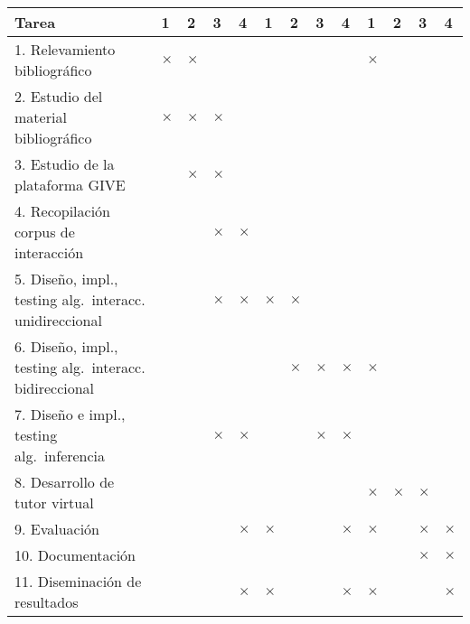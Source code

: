 {\footnotesize
\begin{center}
\begin{tabular}{|p{7cm}||p{2mm}|p{2mm}|p{2mm}|p{2mm}||p{2mm}|p{2mm}|p{2mm}|p{2mm
}||p{2mm}|p{2mm}|p{2mm}|p{2mm}||}
\hline
 \rowcolor[rgb]{0.8,0.8,0.8}\hspace{3.5cm}Tarea & 1 & 2 & 3 & 4 & 1 & 2 & 3 & 4
& 1 & 2 & 3 & 4\\
\hline 1. Relevamiento bibliogr\'afico & $\times$ & $\times$ &&&&&&&$\times$&&&\\
\hline 2. Estudio del material bibliogr\'afico & $\times$ & $\times$ & $\times$ &  &&&&&&&&\\
\hline 3. Estudio de la plataforma GIVE & & $\times$ &$\times$&&&&&&&&&\\
\hline 4. Recopilaci\'on corpus de interacci\'on & & & $\times$ &$\times$&&&&&&&&\\
\hline 5. Dise\~no, impl., testing alg.\ interacc. unidireccional & & & $\times$ & $\times$&$\times$&$\times$&&&&&&\\
\hline 6. Dise\~no, impl., testing alg.\ interacc. bidireccional & & &  & &&$\times$&$\times$&$\times$&$\times$&&&\\
\hline 7. Dise\~no e impl., testing alg.\ inferencia & & & $\times$ & $\times$&&&$\times$&$\times$&&&&\\
\hline 8. Desarrollo de tutor virtual &&&&&&&&&$\times$&$\times$&$\times$&\\
\hline 9. Evaluaci\'on &&&&$\times$&$\times$&&&$\times$&$\times$&&$\times$&$\times$\\
\hline 10. Documentaci\'on &&&&&&&&&&&$\times$&$\times$\\
\hline 11. Diseminaci\'on de resultados &&&&$\times$&$\times$&&&$\times$&$\times$&&&$\times$\\\hline
\end{tabular}\end{center}
}


